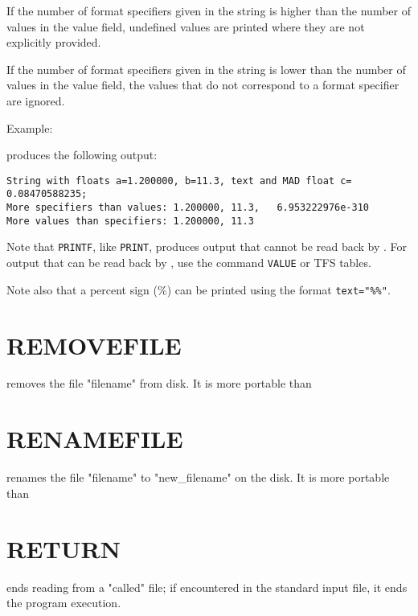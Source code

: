 If the number of format specifiers given in the string is higher 
than the number of values in the value field, undefined values are printed 
where they are not explicitly provided. 

If the number of format specifiers given in the string is lower 
than the number of values in the value field, the values that 
do not correspond to a format specifier are ignored. 


Example: \\

produces the following output:
\begin{verbatim}
String with floats a=1.200000, b=11.3, text and MAD float c=     0.08470588235;
More specifiers than values: 1.200000, 11.3,   6.953222976e-310
More values than specifiers: 1.200000, 11.3
\end{verbatim}

Note that \texttt{PRINTF}, like \texttt{PRINT}, produces output that
cannot be read back by \madx. For output that can be read back by \madx,
use the command \texttt{VALUE} or TFS tables.

Note also that a percent sign (\%) can be printed using the format
\verb|text="%%"|. 


\section{REMOVEFILE}
\label{sec:removefile}
removes the file "filename" from disk. It is more portable than  

\section{RENAMEFILE}
\label{sec:renamefile}
renames the file "filename" to "new\_filename" on the disk. It is more
portable than  


\section{RETURN}
\label{Sec:return}
ends reading from a "called" file; if encountered in the standard input
file, it ends the program execution.  

